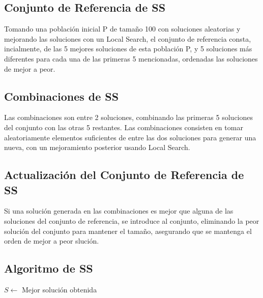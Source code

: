 \documentclass{ci5652}
\begin{document}
\subsection{Conjunto de Referencia de SS}
Tomando una población inicial P de tamaño 100 con soluciones aleatorias y mejorando las soluciones con un Local Search, el conjunto de referencia consta, incialmente, de las 5 mejores soluciones de esta población P, y 5 soluciones más diferentes para cada una de las primeras 5 mencionadas, ordenadas las soluciones de mejor a peor.

\subsection{Combinaciones de SS}
Las combinaciones son entre 2 soluciones, combinando las primeras 5 soluciones del conjunto con las otras 5 restantes. Las combinaciones consisten en tomar aleatoriamente elementos suficientes de entre las dos soluciones para generar una nueva, con un mejoramiento posterior usando Local Search.

\subsection{Actualización del Conjunto de Referencia de SS}
Si una solución generada en las combinaciones es mejor que alguna de las soluciones del conjunto de referencia, se introduce al conjunto, eliminando la peor solución del conjunto para mantener el tamaño, asegurando que se mantenga el orden de mejor a peor slución.

\subsection{Algoritmo de SS}
\begin{algorithm}
\DontPrintSemicolon
$S \leftarrow$ Mejor solución obtenida\;
\end{algorithm}
\end{document}
